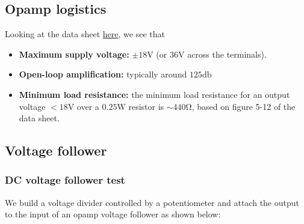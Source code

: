 \documentclass[11pt]{article}
\begin{document}
\subsection{Opamp logistics}

\noin
Looking at the data sheet \href{https://www.ti.com/lit/ds/symlink/tl081.pdf}{here}, 
we see that
\begin{itemize}
	\item \textbf{Maximum supply voltage:} $\pm 18\si{\volt}$ (or
	$36\si{\volt}$ across the terminals).
	\item \textbf{Open-loop amplification:} typically around $125\si{\decibel}$
	\item \textbf{Minimum load resistance:} the minimum load resistance
	for an output voltage $<18 \si{\volt}$ over a $0.25 \si{\watt}$ resistor is
	$\sim 440 \si{\ohm}$, based on figure 5-12 of the data sheet. 
\end{itemize}

\subsection{Voltage follower}

\subsubsection{DC voltage follower test}
We build a voltage divider controlled by a potentiometer and attach the output 
to the input of an opamp voltage follower as shown below:
\end{document}
